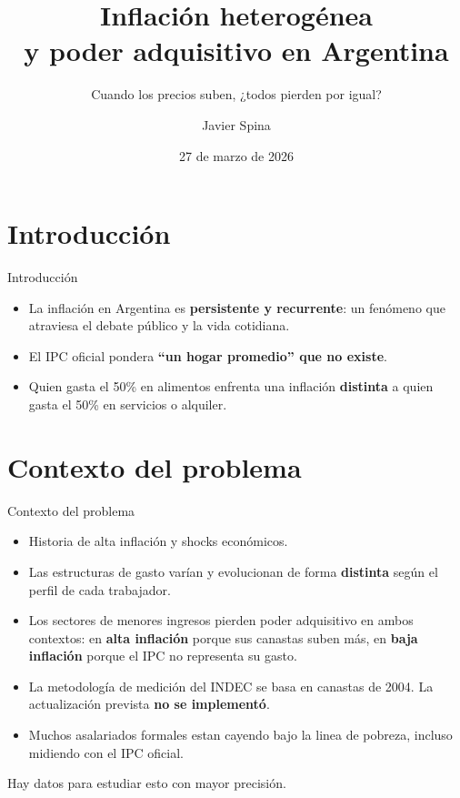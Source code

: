 \documentclass{beamer}
\title[Inflación y poder adquisitivo]{Inflación heterogénea\\y poder adquisitivo en Argentina}
\subtitle{Cuando los precios suben, ¿todos pierden por igual?}
\author{Javier Spina}
\institute{ECyT - UNSAM}
\date{27 de marzo de 2026}
\begin{document}
\begin{frame}
    \titlepage
\end{frame}


\section{Introducción}
\begin{frame}{Introducción}
    \begin{itemize}
        \item La inflación en Argentina es \textbf{persistente y recurrente}: un fenómeno que atraviesa el debate público y la vida cotidiana.
        \item El IPC oficial pondera \textbf{``un hogar promedio'' que no existe}.
        \item Quien gasta el 50\% en alimentos enfrenta una inflación
        \textbf{distinta} a quien gasta el 50\% en servicios o alquiler.
    \end{itemize}
\end{frame}


\section{Contexto del problema}
\begin{frame}{Contexto del problema}
    \begin{itemize}
        \item Historia de alta inflación y shocks económicos.
        \item Las estructuras de gasto varían y evolucionan de forma 
        \textbf{distinta} según el perfil de cada trabajador.
        \item Los sectores de menores ingresos pierden poder adquisitivo 
        en ambos contextos: en \textbf{alta inflación} porque sus canastas 
        suben más, en \textbf{baja inflación} porque el IPC no representa 
        su gasto.
        \item La metodología de medición del INDEC se basa en canastas 
        de 2004. La actualización prevista \textbf{no se implementó}.
        \item Muchos asalariados formales estan cayendo bajo la linea de pobreza, incluso midiendo con el IPC oficial.
    \end{itemize}
    \vspace{0.5em}
    \begin{block}{}
        Hay datos para estudiar esto con mayor precisión.
    \end{block}
\end{frame}
\end{document}
